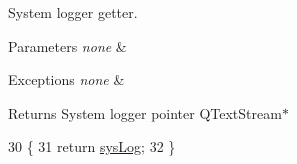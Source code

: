 System logger getter. 


\begin{DoxyParams}{Parameters}
{\em none} & \\
\hline
\end{DoxyParams}

\begin{DoxyExceptions}{Exceptions}
{\em none} & \\
\hline
\end{DoxyExceptions}
\begin{DoxyReturn}{Returns}
System logger pointer Q\-Text\-Stream$\ast$ 
\end{DoxyReturn}

\begin{DoxyCode}
30 \{
31     \textcolor{keywordflow}{return} \hyperlink{a00014_af915a8ab61a55c6cc5564aa9f79cea25}{sysLog};
32 \}
\end{DoxyCode}


